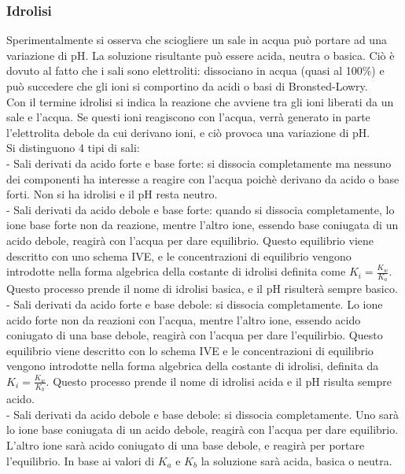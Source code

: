 \subsubsection{Idrolisi}
Sperimentalmente si osserva che sciogliere un sale in acqua può portare ad una variazione di pH. La soluzione risultante può essere acida, neutra o basica. Ciò è dovuto al fatto che i sali sono elettroliti: dissociano in acqua (quasi al 100\%) e può succedere che gli ioni si comportino da acidi o basi di Bronsted-Lowry.\\
Con il termine idrolisi si indica la reazione che avviene tra gli ioni liberati da un sale e l'acqua. Se questi ioni reagiscono con l'acqua, verrà generato in parte l'elettrolita debole da cui derivano ioni, e ciò provoca una variazione di pH.\\
Si distinguono 4 tipi di sali:\\
\tab- Sali derivati da acido forte e base forte: si dissocia completamente ma nessuno dei componenti ha interesse a reagire con l'acqua poichè derivano da acido o base forti. Non si ha idrolisi e il pH resta neutro.\\
\tab- Sali derivati da acido debole e base forte: quando si dissocia completamente, lo ione base forte non da reazione, mentre l'altro ione, essendo base coniugata di un acido debole, reagirà con l'acqua per dare equilibrio. Questo equilibrio viene descritto con uno schema IVE, e le concentrazioni di equilibrio vengono introdotte nella forma algebrica della costante di idrolisi definita come $K_i = \frac{K_w}{K_a}$. Questo processo prende il nome di idrolisi basica, e il pH risulterà sempre basico.\\
\tab- Sali derivati da acido forte e base debole: si dissocia completamente. Lo ione acido forte non da reazioni con l'acqua, mentre l'altro ione, essendo acido coniugato di una base debole, reagirà con l'acqua per dare l'equilirbio. Questo equilibrio viene descritto con lo schema IVE e le concentrazioni di equilibrio vengono introdotte nella forma algebrica della costante di idrolisi, definita da $K_i = \frac{K_w}{K_b}$. Questo processo prende il nome di idrolisi acida e il pH risulta sempre acido.\\
\tab- Sali derivati da acido debole e base debole: si dissocia completamente. Uno sarà lo ione base coniugata di un acido debole, reagirà con l'acqua per dare equilibrio. L'altro ione sarà acido coniugato di una base debole, e reagirà per portare l'equilibrio. In base ai valori di $K_a$ e $K_b$ la soluzione sarà acida, basica o neutra.
